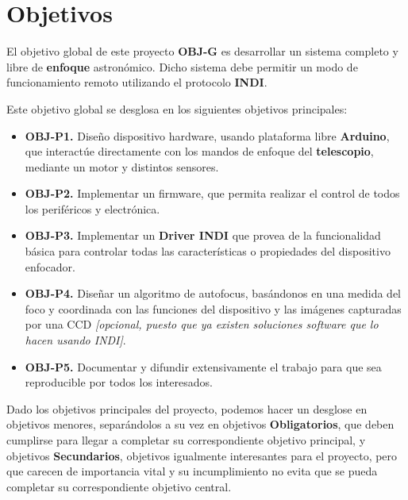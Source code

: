 \chapter{Objetivos}
\label{cap:objetivos}

El objetivo global de este proyecto \textbf{OBJ-G} es desarrollar un sistema completo y libre de \textbf{enfoque} astronómico. Dicho sistema debe permitir un modo de funcionamiento remoto utilizando el protocolo \textbf{INDI}.


\bigskip
Este objetivo global se desglosa en los siguientes objetivos principales:

\begin{itemize}
  \item \textbf{OBJ-P1.} Diseño dispositivo hardware, usando plataforma libre \textbf{Arduino},
  que interactúe directamente con los mandos de enfoque del \textbf{telescopio}, mediante un motor y distintos sensores.
  \item \textbf{OBJ-P2.} Implementar un firmware, que permita realizar el control de todos los periféricos y electrónica.
  \item \textbf{OBJ-P3.} Implementar un \textbf{Driver INDI} que provea de la funcionalidad básica para controlar
   todas las características o propiedades del dispositivo enfocador.
  \item \textbf{OBJ-P4.} Diseñar un algoritmo de autofocus, basándonos en una medida del foco y coordinada con las funciones del dispositivo y las imágenes capturadas por una CCD \textit{[opcional, puesto que ya existen soluciones software que lo hacen usando INDI]}.

\item \textbf{OBJ-P5.} Documentar y difundir extensivamente el trabajo para que sea reproducible por todos los interesados.

\end{itemize}


\bigskip
Dado los objetivos principales del proyecto, podemos hacer un desglose en objetivos menores, separándolos a su vez en objetivos  \textbf{Obligatorios}, que deben cumplirse para llegar a completar su correspondiente objetivo principal, y objetivos \textbf{Secundarios}, objetivos igualmente interesantes para el proyecto, pero que carecen de importancia vital y su incumplimiento no evita que se pueda completar su correspondiente objetivo central.
\newpage

